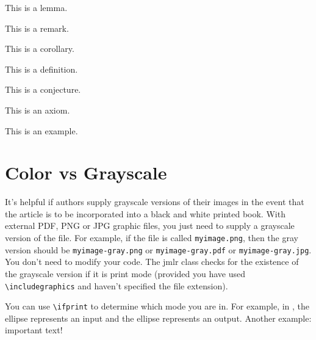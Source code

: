 \documentclass[pmlr]{jmlr}%
\begin{document}
\begin{lemma}\label{lem:sample}
This is a lemma.
\end{lemma}

\begin{remark}\label{rem:sample}
This is a remark.
\end{remark}

\begin{corollary}\label{cor:sample}
This is a corollary.
\end{corollary}

\begin{definition}\label{def:sample}
This is a definition.
\end{definition}

\begin{conjecture}\label{con:sample}
This is a conjecture.
\end{conjecture}

\begin{axiom}\label{ax:sample}
This is an axiom.
\end{axiom}

\begin{example}[An Example]\label{ex:sample}
This is an example.
\end{example}

\section{Color vs Grayscale}
\label{sec:color}

It's helpful if authors supply grayscale versions of their
images in the event that the article is to be incorporated into
a black and white printed book. With external PDF, PNG or JPG
graphic files, you just need to supply a grayscale version of the
file. For example, if the file is called \texttt{myimage.png},
then the gray version should be \texttt{myimage-gray.png} or
\texttt{myimage-gray.pdf} or \texttt{myimage-gray.jpg}. You don't
need to modify your code. The \textsf{jmlr} class checks for
the existence of the grayscale version if it is print mode 
(provided you have used \verb|\includegraphics| and haven't
specified the file extension).

You can use \verb|\ifprint| to determine which mode you are in.
For example, in , the 
 ellipse represents an input and the
 ellipse represents an output.
Another example: {\ifprint{\bfseries}{\color{red}}important text!}
\end{document}

